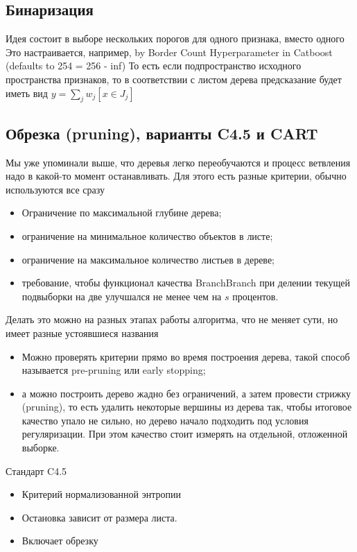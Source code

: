 \subsection{Бинаризация}

Идея состоит в выборе нескольких порогов для одного признака, вместо одного
Это настраивается, например, by Border Count Hyperparameter in Catboost (defaults to 254 = 256 - inf)
То есть если подпространство исходного пространства признаков, то в соответствии с листом дерева предсказание
будет иметь вид $y = \sum_j w_j [x \in J_j] $

\subsection{Обрезка (pruning), варианты C4.5 и CART}

Мы уже упоминали выше, что деревья легко переобучаются и процесс ветвления надо в какой-то момент останавливать.
Для этого есть разные критерии, обычно используются все сразу

\begin{itemize}
    \item Ограничение по максимальной глубине дерева;
    \item ограничение на минимальное количество объектов в листе;
    \item ограничение на максимальное количество листьев в дереве;
    \item требование, чтобы функционал качества BranchBranch при делении текущей подвыборки на две улучшался не
    менее чем на $s$ процентов.
\end{itemize}

Делать это можно на разных этапах работы алгоритма, что не меняет сути, но имеет разные устоявшиеся названия

\begin{itemize}
    \item Можно проверять критерии прямо во время построения дерева, такой способ называется pre-pruning или early
    stopping;
    \item а можно построить дерево жадно без ограничений, а затем провести стрижку (pruning), то есть удалить
    некоторые вершины из дерева так, чтобы итоговое качество упало не сильно, но дерево начало подходить под условия
    регуляризации.
    При этом качество стоит измерять на отдельной, отложенной выборке.
\end{itemize}

Стандарт C4.5
\begin{itemize}
    \item Критерий нормализованной энтропии
    \item Остановка зависит от размера листа.
    \item Включает обрезку
\end{itemize}

